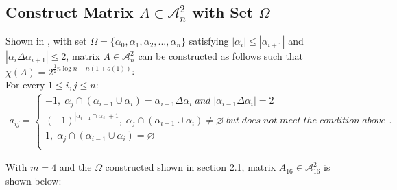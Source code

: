 \documentclass[11pt]{article}
\begin{document}
\subsection{Construct Matrix $A \in \mathcal{A}_n^2$ with Set $\Omega$}
Shown in \cite{ALON1997133}, with set $\Omega = \{\alpha_0, \alpha_1, \alpha_2, ..., \alpha_n\}$ satisfying $|\alpha_i| \leq |\alpha_{i+1}|$ and $|\alpha_i \Delta \alpha_{i+1}| \leq 2$, matrix $A \in \mathcal{A}_n^2$ can be constructed as follows such that $\chi(A)=2^{\frac{1}{2}n\log n-n(1+o(1))}$:\\
For every $1 \leq i,j \leq n$:
\begin{align*}
    a_{ij} = 
    \begin{cases}
    -1,\;\alpha_j\cap(\alpha_{i-1}\cup\alpha_i)=\alpha_{i-1}\Delta\alpha_{i}\;and\;|\alpha_{i-1}\Delta\alpha_{i}|=2 \\
    (-1)^{|\alpha_{i-1}\cap\alpha_j| + 1},\;\alpha_{j}\cap(\alpha_{i-1}\cup\alpha_{i})\neq\varnothing\;but\;does\;not\;meet\;the\;condition\;above \\
    1,\;\alpha_j\cap(\alpha_{i-1}\cup\alpha_i)=\varnothing \\
    \end{cases}.
\end{align*}

With $m = 4$ and the $\Omega$ constructed shown in section 2.1, matrix $A_{16} \in \mathcal{A}_{16}^2$ is shown below:
\end{document}
